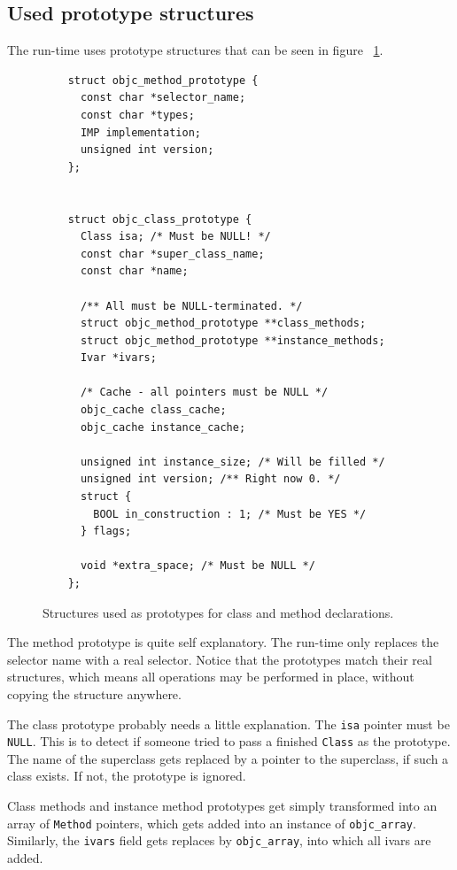\subsection{Used prototype structures}

The run-time uses prototype structures that can be seen in figure ~\ref{fig:objc_prototypes}.

\begin{figure}
  \begin{verbatim}
    struct objc_method_prototype {
      const char *selector_name;
      const char *types;
      IMP implementation;
      unsigned int version;
    };
    
    
    struct objc_class_prototype {
      Class isa; /* Must be NULL! */
      const char *super_class_name;
      const char *name;
	
      /** All must be NULL-terminated. */
      struct objc_method_prototype **class_methods;
      struct objc_method_prototype **instance_methods;
      Ivar *ivars;
	
      /* Cache - all pointers must be NULL */
      objc_cache class_cache;
      objc_cache instance_cache;
	
      unsigned int instance_size; /* Will be filled */
      unsigned int version; /** Right now 0. */
      struct {
        BOOL in_construction : 1; /* Must be YES */
      } flags;
      
      void *extra_space; /* Must be NULL */
    };
  \end{verbatim}
  \centering{}
  \caption{Structures used as prototypes for class and method declarations.}
  \label{fig:objc_prototypes}
\end{figure}

The method prototype is quite self explanatory. The run-time only replaces the selector name with a real selector. Notice that the prototypes match their real structures, which means all operations may be performed in place, without copying the structure anywhere.

The class prototype probably needs a little explanation. The \verb=isa= pointer must be \verb=NULL=. This is to detect if someone tried to pass a finished \verb=Class= as the prototype. The name of the superclass gets replaced by a pointer to the superclass, if such a class exists. If not, the prototype is ignored.

Class methods and instance method prototypes get simply transformed into an array of \verb=Method= pointers, which gets added into an instance of \verb=objc_array=. Similarly, the \verb=ivars= field gets replaces by \verb=objc_array=, into which all ivars are added.

